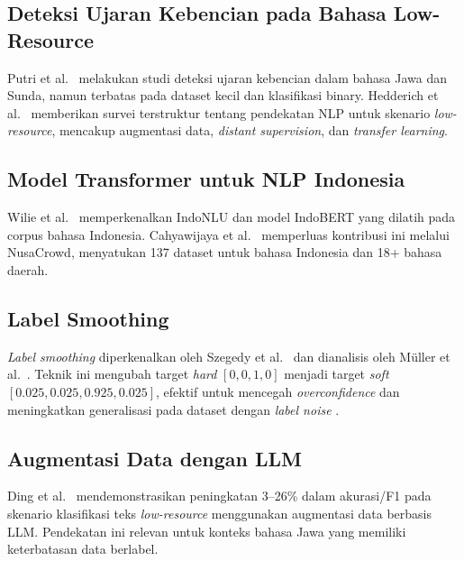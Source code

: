 \documentclass[10pt,twocolumn]{article}
\begin{document}
\subsection{Deteksi Ujaran Kebencian pada Bahasa Low-Resource}

Putri et al.\ \cite{putri2021} melakukan studi deteksi ujaran kebencian dalam bahasa Jawa dan Sunda, namun terbatas pada dataset kecil dan klasifikasi binary. Hedderich et al.\ \cite{hedderich2021} memberikan survei terstruktur tentang pendekatan NLP untuk skenario \textit{low-resource}, mencakup augmentasi data, \textit{distant supervision}, dan \textit{transfer learning}.

\subsection{Model Transformer untuk NLP Indonesia}

Wilie et al.\ \cite{wilie2020} memperkenalkan IndoNLU dan model IndoBERT yang dilatih pada corpus bahasa Indonesia. Cahyawijaya et al.\ \cite{cahyawijaya2023} memperluas kontribusi ini melalui NusaCrowd, menyatukan 137 dataset untuk bahasa Indonesia dan 18+ bahasa daerah.

\subsection{Label Smoothing}

\textit{Label smoothing} diperkenalkan oleh Szegedy et al.\ \cite{szegedy2015} dan dianalisis oleh M\"uller et al.\ \cite{mueller2019}. Teknik ini mengubah target \textit{hard} $[0,0,1,0]$ menjadi target \textit{soft} $[0.025, 0.025, 0.925, 0.025]$, efektif untuk mencegah \textit{overconfidence} dan meningkatkan generalisasi pada dataset dengan \textit{label noise} \cite{mueller2019}.

\subsection{Augmentasi Data dengan LLM}

Ding et al.\ \cite{ding2024} mendemonstrasikan peningkatan 3--26\% dalam akurasi/F1 pada skenario klasifikasi teks \textit{low-resource} menggunakan augmentasi data berbasis LLM. Pendekatan ini relevan untuk konteks bahasa Jawa yang memiliki keterbatasan data berlabel.

\end{document}

